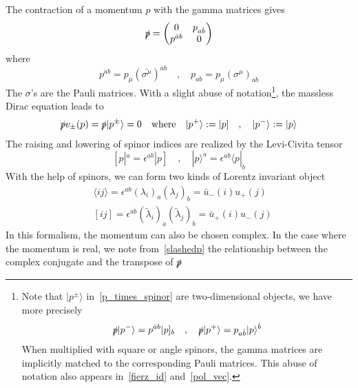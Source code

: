 The contraction of a momentum $p$ with the gamma matrices gives
\begin{equation}\label{slashedp}
\slashed{p} = \begin{pmatrix}
0 & p_{a\dot{b}} \\ 
p^{\dot{a}b} & 0
\end{pmatrix}
\end{equation}
where 
\begin{equation}
p^{\dot{a}b} = p_\mu(\bar{\sigma^\mu})^{\dot{a}b}
\quad,\quad
p_{a\dot{b}} = p_\mu(\sigma^\mu)_{a\dot{b}}
\end{equation}
The $\sigma$'s are the Pauli matrices.
With a slight abuse of notation\footnote{
Note that $|p^\pm\rangle$ in~\cref{p_times_spinor} are two-dimensional objects, we have more precisely
\begin{equation}
\slashed{p}|p^-\rangle = p^{\dot{a}b}|p]_b
\quad,\quad
\slashed{p}|p^+\rangle = p_{a\dot{b}}|p\rangle^{\dot{b}}
\end{equation}
When multiplied with square or angle spinors, the gamma matrices are implicitly matched to the corresponding Pauli matrices.
This abuse of notation also appears in~\cref{fierz_id} and~\cref{pol_vec}.
}, the massless Dirac equation leads to
\begin{equation}\label{p_times_spinor}
\slashed{p}v_\pm (p) = \slashed{p}|p^\pm\rangle = 0
\quad \mathrm{where}\quad
|p^+\rangle := |p]
\quad,\quad
|p^-\rangle := |p\rangle
\end{equation}
The raising and lowering of spinor indices are realized by the Levi-Civita tensor
\begin{equation}\label{levi-civita}
[p|^a = \epsilon^{ab}|p] \quad,\quad
|p\rangle^{\dot{a}} = \epsilon^{\dot{a}\dot{b}}\langle p |_{\dot{b}}
\end{equation}
With the help of spinors, we can form two kinds of Lorentz invariant object
\begin{equation}\label{spinor_pdt}
\begin{split}
& \langle ij \rangle = \epsilon^{ab}(\lambda_i)_a(\lambda_j)_b = \bar{u}_-(i)u_+(j)
\\
& [ij] = \epsilon^{\dot{a}\dot{b}}(\tilde{\lambda}_i)_{\dot{a}}(\tilde{\lambda}_j)_{\dot{b}} = \bar{u}_+(i)u_-(j)
\end{split}
\end{equation}
In this formalism, the momentum can also be chosen complex. 
In the case where the momentum is real, we note from~\cref{slashedp} the relationship between the complex conjugate and the transpose of $\slashed{p}$
